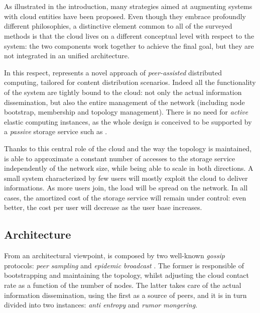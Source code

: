 \chapter{\cloudcast}

As illustrated in the introduction, many strategies aimed at
augmenting \ptop systems with cloud entities have been
proposed. Even though they embrace profoundly different philosophies,
a distinctive element common to all of the surveyed methods
is that the cloud lives on a different conceptual level with respect
to the \ptop system: the two components work together to achieve the
final goal, but they are not integrated in an unified architecture.

In this respect, \cloudcast \cite{Cloudcast} represents a novel approach
of \emph{peer-assisted} distributed computing, tailored for content
distribution scenarios. Indeed all the functionality of the system are
tightly bound to the cloud: not only the actual information
dissemination, but also the entire management of the \ptop network
(including node bootstrap, membership and topology management). There is
no need for \emph{active} elastic computing instances, as the
whole design is conceived to be supported by a \emph{passive} storage
service such as \amazonsss.

Thanks to this central role of the cloud and the way the topology is
maintained, \cloudcast is able to approximate a constant number of accesses
to the storage service independently of the network size, while
being able to scale in both directions. A small system characterized by
few users will mostly exploit the cloud to deliver informations. As
more users join, the load will be spread on the
\ptop network. In all cases, the amortized cost of the storage service
will remain under control: even better, the cost per user will
decrease as the user base increases.

\section{Architecture}
From an architectural viewpoint, \cloudcast is composed by two
well-known \emph{gossip} protocols:
\emph{peer sampling} \cite{GossipPeerSampling}
and \emph{epidemic broadcast} \cite{EpidemicAlgorithms}.
The former is responsible of bootstrapping and maintaining the topology,
whilst adjusting the cloud contact rate as a function of the number
of nodes. The latter takes care of the actual information
dissemination, using the first as a source of peers, and it is in turn
divided into two instances: \emph{anti entropy} and \emph{rumor mongering}.

